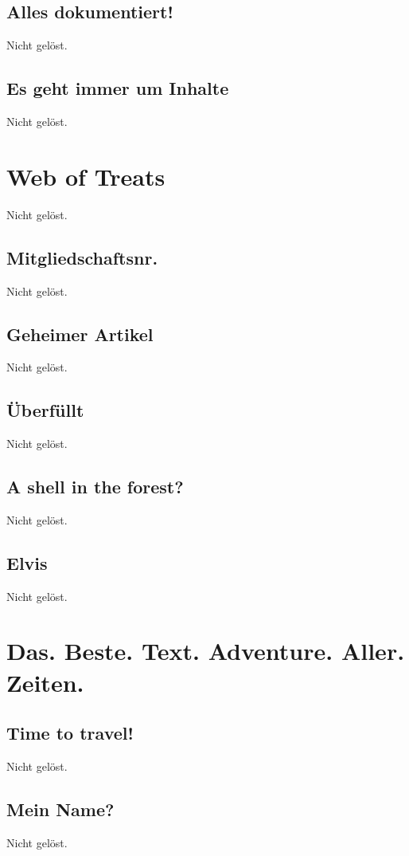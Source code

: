 \documentclass[12pt, a4paper, titlepage, oneside]{scrartcl}
\begin{document}
	\subsection{Alles dokumentiert!}
	Nicht gelöst.

	\subsection{Es geht immer um Inhalte}
	Nicht gelöst.

	\section{Web of Treats}
	Nicht gelöst.

	\subsection{Mitgliedschaftsnr.}
	Nicht gelöst.

	\subsection{Geheimer Artikel}
	Nicht gelöst.

	\subsection{\"Uberf\"ullt}
	Nicht gelöst.

	\subsection{A shell in the forest?}
	Nicht gelöst.

	\subsection{Elvis}
	Nicht gelöst.

	\section{Das. Beste. Text. Adventure. Aller. Zeiten.}

	\subsection{Time to travel!}
	Nicht gelöst.

	\subsection{Mein Name?}
	Nicht gelöst.
\end{document}
